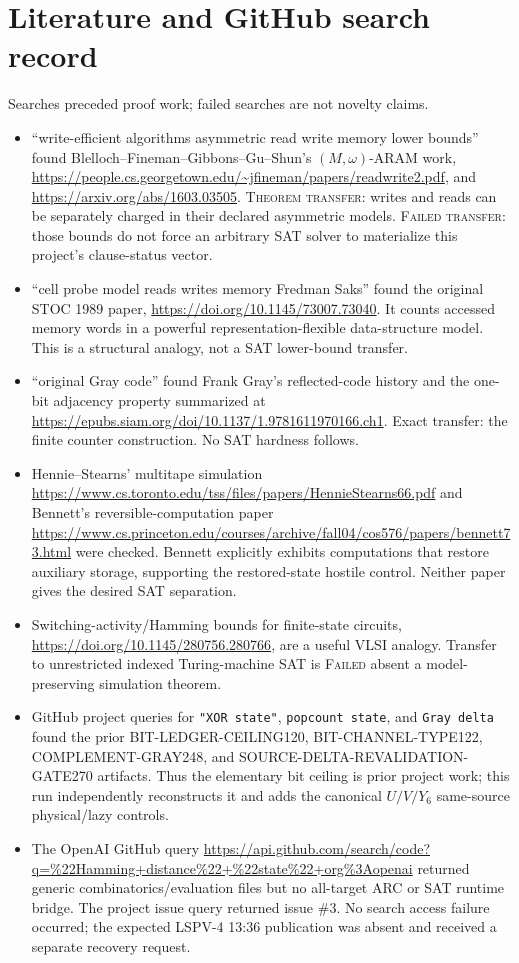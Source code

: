\documentclass[11pt]{article}
\newcommand{\Status}[1]{\textsc{#1}}
\begin{document}
\section{Literature and GitHub search record}
Searches preceded proof work; failed searches are not novelty claims.
\begin{itemize}
\item ``write-efficient algorithms asymmetric read write memory lower bounds''
found Blelloch--Fineman--Gibbons--Gu--Shun's $(M,\omega)$-ARAM work,
\url{https://people.cs.georgetown.edu/~jfineman/papers/readwrite2.pdf}, and
\url{https://arxiv.org/abs/1603.03505}.  \Status{Theorem transfer}: writes and
reads can be separately charged in their declared asymmetric models.
\Status{Failed transfer}: those bounds do not force an arbitrary SAT solver to
materialize this project's clause-status vector.
\item ``cell probe model reads writes memory Fredman Saks'' found the original
STOC 1989 paper, \url{https://doi.org/10.1145/73007.73040}.  It counts accessed
memory words in a powerful representation-flexible data-structure model.
This is a structural analogy, not a SAT lower-bound transfer.
\item ``original Gray code'' found Frank Gray's reflected-code history and the
one-bit adjacency property summarized at
\url{https://epubs.siam.org/doi/10.1137/1.9781611970166.ch1}.  Exact transfer:
the finite counter construction.  No SAT hardness follows.
\item Hennie--Stearns' multitape simulation
\url{https://www.cs.toronto.edu/tss/files/papers/HennieStearns66.pdf} and
Bennett's reversible-computation paper
\url{https://www.cs.princeton.edu/courses/archive/fall04/cos576/papers/bennett73.html}
were checked.  Bennett explicitly exhibits computations that restore auxiliary
storage, supporting the restored-state hostile control.  Neither paper gives
the desired SAT separation.
\item Switching-activity/Hamming bounds for finite-state circuits,
\url{https://doi.org/10.1145/280756.280766}, are a useful VLSI analogy.
Transfer to unrestricted indexed Turing-machine SAT is \Status{Failed} absent
a model-preserving simulation theorem.
\item GitHub project queries for \texttt{"XOR state"},
\texttt{popcount state}, and \texttt{Gray delta} found the prior
BIT-LEDGER-CEILING120, BIT-CHANNEL-TYPE122, COMPLEMENT-GRAY248, and
SOURCE-DELTA-REVALIDATION-GATE270 artifacts.  Thus the elementary bit ceiling
is prior project work; this run independently reconstructs it and adds the
canonical $U/V/Y_6$ same-source physical/lazy controls.
\item The OpenAI GitHub query
\url{https://api.github.com/search/code?q=%22Hamming+distance%22+%22state%22+org%3Aopenai}
returned generic combinatorics/evaluation files but no all-target ARC or SAT
runtime bridge.  The project issue query returned issue \#3.  No search access
failure occurred; the expected LSPV-4 13:36 publication was absent and received
a separate recovery request.
\end{itemize}
\end{document}
